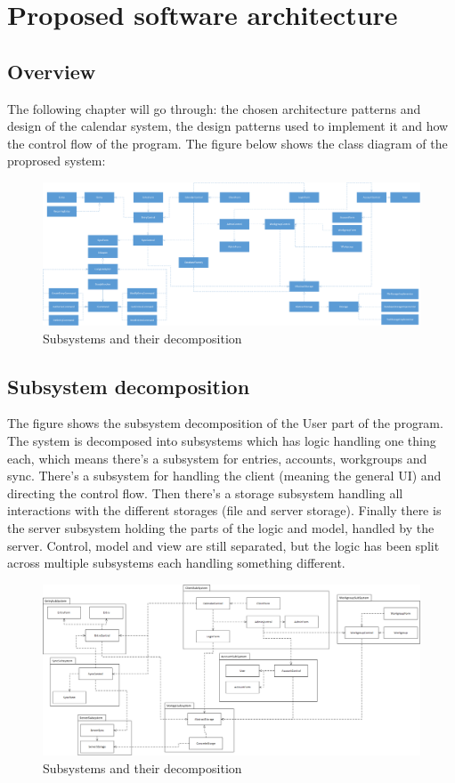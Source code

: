 \section{Proposed software architecture}

\subsection{Overview}
The following chapter will go through: the chosen architecture patterns and design of the calendar system, the design patterns used to implement it and how the control flow of the program.
\newline
The figure below shows the class diagram of the proprosed system:

\begin{figure}[h]
\centering
\includegraphics[scale = 0.3]{ClassDiagram}
\caption{Subsystems and their decomposition}
\end{figure}

\subsection{Subsystem decomposition}
The figure shows the subsystem decomposition of the User part of the program. The system is decomposed into subsystems which has logic handling one thing each, which means there’s a subsystem for entries, accounts, workgroups and sync. 
There’s a subsystem for handling the client (meaning the general UI) and directing the control flow. Then there’s a storage subsystem handling all interactions with the different storages (file and server storage). Finally there is the server subsystem holding the parts of the logic and model, handled by the server.
Control, model and view are still separated, but the logic has been split across multiple subsystems each handling something different.

\begin{figure}[h]
\centering
\includegraphics[scale = 0.35]{Subsystem}
\caption{Subsystems and their decomposition}
\end{figure}

